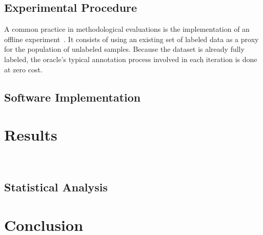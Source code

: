 \documentclass[parskip=full]{scrartcl}
\begin{document}
\subsection{Experimental Procedure}

A common practice in methodological evaluations is the implementation of an offline
experiment~\cite{Kagy2019}. It consists of using an existing set of labeled data as a proxy for the
population of unlabeled samples. Because the dataset is already fully labeled, the oracle's typical
annotation process involved in each iteration is done at zero cost.



\subsection{Software Implementation}

\section{Results}~\label{sec:results}

\subsection{Statistical Analysis}

\section{Conclusion}~\label{sec:conclusion}



\end{document}
